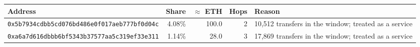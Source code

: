 \begin{tabular}{p{7.4cm} r r r p{3cm}}\toprule
\textbf{Address} & \textbf{Share} & \textbf{$\approx$ ETH} & \textbf{Hops} & \textbf{Reason}\\\midrule
\texttt{\scriptsize 0x5b7934cdbb5cd076bd486e0f017aeb777bf0d04c} & 4.08\% & 100.0 & 2 & 10,512 transfers in the window; treated as a service\\
\texttt{\scriptsize 0xa6a7d616dbbb6bf5343b37577aa5c319ef33e311} & 1.14\% & 28.0 & 3 & 17,869 transfers in the window; treated as a service\\
\bottomrule\end{tabular}
